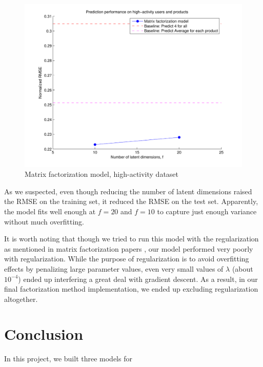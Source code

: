 \documentclass[letterpaper, 11 pt, conference]{ieeeconf}
\begin{document}
\begin{figure}[h]
\includegraphics[scale=0.5]{images/modelthree_subset.pdf}
\caption{Matrix factorization model, high-activity dataset}
\label{fig:modelthree_subset}
\end{figure}

As we suspected, even though reducing the number of
latent dimensions raised the RMSE on the training set, it reduced the RMSE on
the test set. Apparently, the model fits well enough  at $f = 20$ and
$f = 10$ to capture just enough variance without much overfitting.

It is worth noting that though we tried to run this model with the 
regularization as mentioned in matrix factorization papers 
\cite{bib:matrixfact}, our model performed very poorly with regularization. 
While the purpose of regularization is to avoid overfitting effects by 
penalizing large parameter values, even very small values 
of $\lambda$ (about $10^{-4}$) ended up interfering a great deal with gradient 
descent. As a result, in our final factorization method implementation,
we ended up excluding regularization altogether.



\section{Conclusion}
In this project, we built three models for 
\end{document}
